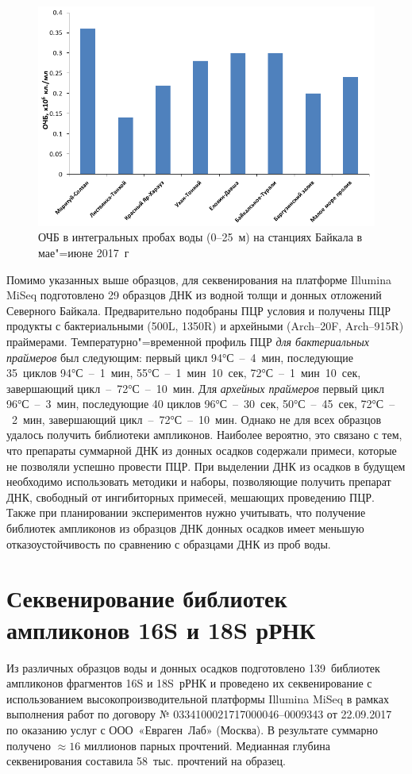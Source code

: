 \documentclass[a4paper,12pt,openany,final]{extreport}
\def\oldcaption{} \let\oldcaption=\caption
\def\caption{\stepcounter{captionsnum}\oldcaption}
\begin{document}
\begin{figure}
  \centering
\includegraphics[width=0.8\linewidth]{media/chart.png}
\caption{ОЧБ в интегральных пробах воды (0--25~м) на станциях Байкала в мае"=июне 2017~г}\label{fig:chart}
\end{figure}


Помимо указанных выше образцов, для секвенирования на платформе Illumina MiSeq подготовлено 29 образцов ДНК из водной толщи и донных отложений Северного Байкала. Предварительно подобраны ПЦР условия и получены ПЦР продукты с бактериальными (500L, 1350R) и архейными (Arch--20F, Arch--915R) праймерами. Температурно"=временной профиль ПЦР \emph{для бактериальных праймеров} был следующим: первый цикл 94°С~--~4~мин, последующие 35~циклов 94°С~--~1~мин, 55°С~--~1~мин~10~сек, 72°С~--~1~мин~10~сек, завершающий цикл~--~72°С~--~10~мин. Для \emph{архейных праймеров} первый цикл 96°С~--~3~мин, последующие 40 циклов 96°С~--~30~сек, 50°С~--~45~сек, 72°С~--~2~мин, завершающий цикл~--~72°С~--~10~мин.  Однако не для всех образцов удалось получить библиотеки ампликонов. Наиболее вероятно, это связано с тем, что препараты суммарной ДНК из донных осадков содержали примеси, которые не позволяли успешно провести ПЦР. При выделении ДНК из осадков в будущем необходимо использовать методики и наборы, позволяющие получить препарат ДНК, свободный от ингибиторных примесей, мешающих проведению ПЦР. Также при планировании экспериментов нужно учитывать, что получение библиотек ампликонов из образцов ДНК донных осадков имеет меньшую отказоустойчивость по сравнению с образцами ДНК из проб воды.

\section{Секвенирование библиотек ампликонов 16S и 18S рРНК}

Из различных образцов воды и донных осадков подготовлено 139~библиотек ампликонов фрагментов 16S и 18S~рРНК и проведено их секвенирование с использованием высокопроизводительной платформы Illumina MiSeq в рамках выполнения работ по договору № 0334100021717000046--0009343 от 22.09.2017 по оказанию услуг с ООО~«Евраген~Лаб» (Москва). В результате суммарно получено \(\approx{}\!\!16\) миллионов парных прочтений. Медианная глубина секвенирования составила 58~тыс. прочтений на образец.
\end{document}
